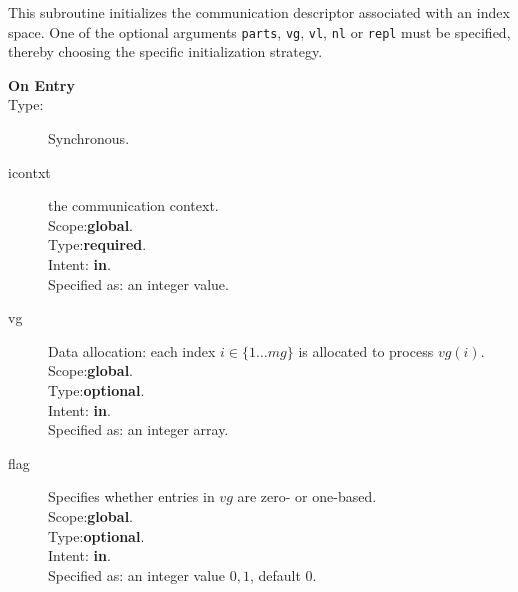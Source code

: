 This subroutine initializes the communication descriptor associated
with an index space. One of the  optional arguments
\verb|parts|, \verb|vg|, \verb|vl|, \verb|nl|  or \verb|repl| 
must be specified, thereby choosing
the specific initialization strategy.
\begin{description}
\item[\bf  On Entry ]
\item[Type:] Synchronous.
\item[icontxt] the communication context.\\
Scope:{\bf global}.\\
Type:{\bf required}.\\
Intent: {\bf in}.\\
Specified as: an integer value.
\item[vg] Data allocation: each index $i\in \{1\dots mg\}$ is allocated
  to process $vg(i)$.\\
Scope:{\bf global}.\\
Type:{\bf optional}.\\
Intent: {\bf in}.\\
Specified as: an integer array. 
\item[flag] Specifies whether entries in $vg$ are zero- or one-based.\\
Scope:{\bf global}.\\
Type:{\bf optional}.\\
Intent: {\bf in}.\\
Specified as: an integer value $0,1$, default $0$.


\end{description}
